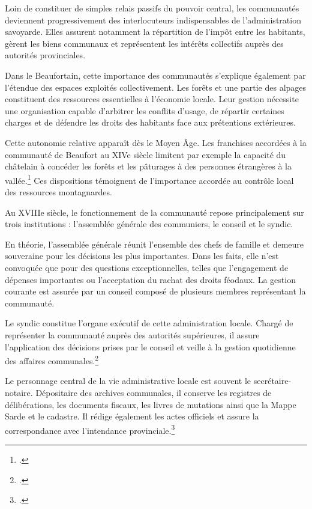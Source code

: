 \documentclass[12pt,a4paper]{report}
\begin{document}
Loin de constituer de simples relais passifs du pouvoir central, les communautés deviennent progressivement des interlocuteurs indispensables de l'administration savoyarde. Elles assurent notamment la répartition de l'impôt entre les habitants, gèrent les biens communaux et représentent les intérêts collectifs auprès des autorités provinciales.

Dans le Beaufortain, cette importance des communautés s'explique également par l'étendue des espaces exploités collectivement. Les forêts et une partie des alpages constituent des ressources essentielles à l'économie locale. Leur gestion nécessite une organisation capable d'arbitrer les conflits d'usage, de répartir certaines charges et de défendre les droits des habitants face aux prétentions extérieures.

Cette autonomie relative apparaît dès le Moyen Âge. Les franchises accordées à la communauté de Beaufort au XIVe siècle limitent par exemple la capacité du châtelain à concéder les forêts et les pâturages à des personnes étrangères à la vallée.\footcite[65]{Mouthon2016} Ces dispositions témoignent de l'importance accordée au contrôle local des ressources montagnardes.

\vspace{1em}

Au XVIIIe siècle, le fonctionnement de la communauté repose principalement sur trois institutions : l'assemblée générale des communiers, le conseil et le syndic.

En théorie, l'assemblée générale réunit l'ensemble des chefs de famille et demeure souveraine pour les décisions les plus importantes. Dans les faits, elle n'est convoquée que pour des questions exceptionnelles, telles que l'engagement de dépenses importantes ou l'acceptation du rachat des droits féodaux. La gestion courante est assurée par un conseil composé de plusieurs membres représentant la communauté.

Le syndic constitue l'organe exécutif de cette administration locale. Chargé de représenter la communauté auprès des autorités supérieures, il assure l'application des décisions prises par le conseil et veille à la gestion quotidienne des affaires communales.\footcite[22]{BordeVibertGuigue1971VieRuraleBeaufort}

Le personnage central de la vie administrative locale est souvent le secrétaire-notaire. Dépositaire des archives communales, il conserve les registres de délibérations, les documents fiscaux, les livres de mutations ainsi que la Mappe Sarde et le cadastre. Il rédige également les actes officiels et assure la correspondance avec l'intendance provinciale.\footcite[22]{BordeVibertGuigue1971VieRuraleBeaufort}
\end{document}
